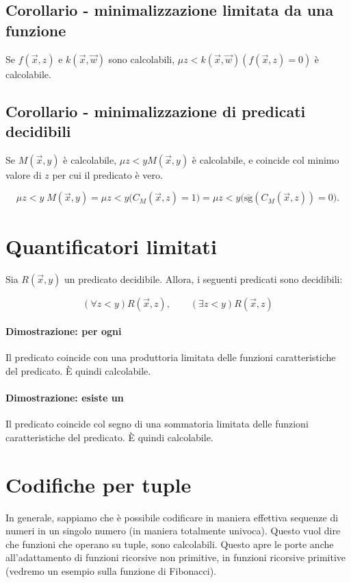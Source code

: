	
	\subsection{Corollario - minimalizzazione limitata da una funzione}
	Se $f(\vec{x},z)$ e $k(\vec{x}, \vec{w})$ sono calcolabili, $\mu z < k(\vec{x}, \vec{w}) (f(\vec{x},z) = 0)$ è calcolabile.
	
	\subsection{Corollario - minimalizzazione di predicati decidibili}
	Se $M(\vec{x},y)$ è calcolabile, $\mu z < y M(\vec{x},y)$ è calcolabile, e coincide col minimo valore di $z$ per cui il predicato è vero.
	
	$$
	\mu z < y\; M(\vec{x},y)
	=
	\mu z < y \big( C_M(\vec{x},z) = 1 \big)
	=
	\mu z < y \big( \overline{\mathrm{sg}}(C_M(\vec{x},z)) = 0 \big).
	$$
	
	
	\section{Quantificatori limitati}
	Sia $R(\vec{x}, y)$ un predicato decidibile. Allora, i seguenti predicati sono decidibili:
	
	$$
	(\forall z < y)R(\vec{x}, z), \qquad 
	(\exists z < y)R(\vec{x}, z)
	$$
	
	\paragraph{Dimostrazione: per ogni}
	Il predicato coincide con una produttoria limitata delle funzioni caratteristiche del predicato. È quindi calcolabile. 
	
	\paragraph{Dimostrazione: esiste un}
	Il predicato coincide col segno di una sommatoria limitata delle funzioni caratteristiche del predicato. È quindi calcolabile.
	
	\section{Codifiche per tuple}
	In generale, sappiamo che è possibile codificare in maniera effettiva sequenze di numeri in un singolo numero (in maniera totalmente univoca).
	Questo vuol dire che funzioni che operano su tuple, sono calcolabili. Questo apre le porte anche all'adattamento di funzioni ricorsive non primitive, in funzioni ricorsive primitive (vedremo un esempio sulla funzione di Fibonacci).
	
